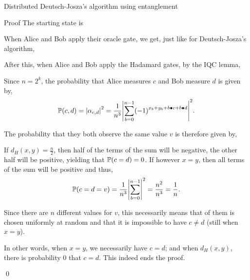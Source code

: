 \documentclass[a4paper]{article}
\begin{document}
\begin{parag}{Distributed Deutsch-Josza's algorithm using entanglement}
    \begin{subparag}{Proof}
        The starting state is 

        When Alice and Bob apply their oracle gate, we get, just like for Deutsch-Josza's algorithm, 

        After this, when Alice and Bob apply the Hadamard gates, by the IQC lemma,
        
        Since $n = 2^k$, the probability that Alice measures $c$ and Bob measure $d$ is given by,
        \[\prob\left(c, d\right) = \left|\alpha_{c, d}\right|^2 = \frac{1}{n^3} \left|\sum_{b = 0}^{n-1} \left(-1\right)^{x_b + y_b + b \dotprod c + b \dotprod d}\right|^2.\]
        
        The probability that they both observe the same value $v$ is therefore given by, 

        If $d_H\left(x, y\right) = \frac{n}{2}$, then half of the terms of the sum will be negative, the other half will be positive, yielding that $\prob\left(c = d\right) = 0$. If however $x = y$, then all terms of the sum will be positive and thus, 
        \[\prob\left(c = d = v\right) = \frac{1}{n^3} \left|\sum_{b=0}^{n-1}\right|^2 = \frac{n^2}{n^3}= \frac{1}{n}.\]
        
        Since there are $n$ different values for $v$, this necessarily means that of them is chosen uniformly at random and that it is impossible to have $c \neq d$ (still when $x = y$).

        In other words, when $x = y$, we necessarily have $c = d$; and when $d_H\left(x, y\right)$, there is probability $0$ that $c = d$. This indeed ends the proof.

        \qed
    \end{subparag}
\end{parag}
\end{document}
